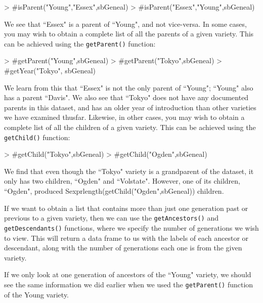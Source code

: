 \documentclass{article}
\numberwithin{equation}{section} %
\begin{document}
\begin{Schunk}
\begin{Sinput}
> #isParent("Young","Essex",sbGeneal)
> #isParent("Essex","Young",sbGeneal)
\end{Sinput}
\end{Schunk}

We see that ``Essex" is a parent of ``Young", and not vice-versa. In some cases, you may wish to obtain a complete list of all the parents of a given variety. This can be achieved using the \texttt{getParent()} function:

\begin{Schunk}
\begin{Sinput}
> #getParent("Young",sbGeneal)
> #getParent("Tokyo",sbGeneal)
> #getYear("Tokyo", sbGeneal)
\end{Sinput}
\end{Schunk}

We learn from this that ``Essex" is not the only parent of ``Young"; ``Young" also has a parent ``Davis". We also see that ``Tokyo" does not have any documented parents in this dataset, and has an older year of introduction than other varieties we have examined thusfar. Likewise, in other cases, you may wish to obtain a complete list of all the children of a given variety. This can be achieved using the \texttt{getChild()} function:

\begin{Schunk}
\begin{Sinput}
> #getChild("Tokyo",sbGeneal)
> #getChild("Ogden",sbGeneal)
\end{Sinput}
\end{Schunk}

We find that even though the ``Tokyo" variety is a grandparent of the dataset, it only has two children, ``Ogden" and ``Volstate". However, one of its children, ``Ogden", produced Sexpr{length(getChild("Ogden",sbGeneal))} children.

If we want to obtain a list that contains more than just one generation past or previous to a given variety, then we can use the \texttt{getAncestors()} and \texttt{getDescendants()} functions, where we specify the number of generations we wish to view. This will return a data frame to us with the labels of each ancestor or descendant, along with the number of generations each one is from the given variety.

If we only look at one generation of ancestors of the ``Young" variety, we should see the same information we did earlier when we used the \texttt{getParent()} function of the Young variety.
\end{document}
